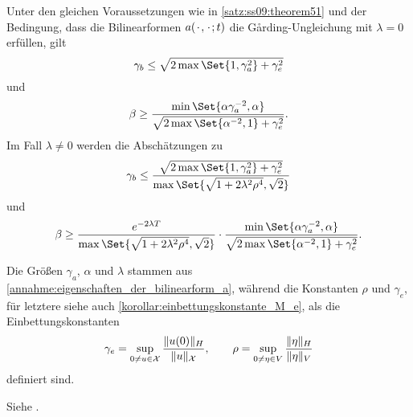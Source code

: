 \begin{Korollar}
\label{korrolar:ss09:theorem51_abschaetzungen}
    Unter den gleichen Voraussetzungen wie in \cref{satz:ss09:theorem51} und der Bedingung, dass die Bilinearformen $a({\mkern2mu\cdot\mkern2mu}, {\mkern2mu\cdot\mkern2mu}; t)$ die G\aa{}rding-Ungleichung mit $\lambda = 0$ erfüllen, gilt
    \begin{equation}
        \label{eq:ss09:theorem51_abschaetzungen:lambda_null:stetig}
        \gamma_{b}  \leq \sqrt{2 \max\Set{1, \gamma_{a}^{2}} + \gamma_{e}^{2}}
    \end{equation}
    und
    \begin{equation}
        \label{eq:ss09:theorem51_abschaetzungen:lambda_null:inf_sup}
        \beta  \geq \frac{\min\Set{\alpha \gamma_{a}^{-2}, \alpha}}{\sqrt{2 \max \Set{\alpha^{-2}, 1} + \gamma_{e}^{2}}}.
    \end{equation}
    Im Fall $\lambda \neq 0$ werden die Abschätzungen zu
    \begin{equation}
        \label{eq:ss09:theorem51_abschaetzungen:lambda_nicht_null:stetig}
        \gamma_{b}  \leq \frac{\sqrt{2\max\Set{1, \gamma_{a}^{2}} + \gamma_{e}^{2}}}{\max\Set{\sqrt{1 + 2 \lambda^{2} \rho^{4}}, \sqrt{2}}}
    \end{equation}
    und
    \begin{equation}
        \label{eq:ss09:theorem51_abschaetzungen:lambda_nicht_null:inf_sup}
        \beta  \geq \frac{ e^{-2 \lambda T}}{\max\Set{\sqrt{1 + 2 \lambda^{2} \rho^{4}}, \sqrt{2}}  } \cdot \frac{\min\Set{\alpha \gamma_{a}^{-2}, \alpha}}{\sqrt{2 \max\Set{ \alpha^{-2}, 1} + \gamma_{e}^{2}}}.
    \end{equation}

    Die Größen $\gamma_{a}$, $\alpha$ und $\lambda$ stammen aus \cref{annahme:eigenschaften_der_bilinearform_a},
    während die Konstanten $\rho$ und $\gamma_{e}$, für letztere siehe auch \cref{korollar:einbettungskonstante_M_e}, als die Einbettungskonstanten
    \begin{equation}
        \label{eq:ss09:einbettungskonstanten}
        \gamma_{e} = \sup_{0 \neq u \in \mathcal X} \frac{\lVert u(0)\rVert_{H}}{\lVert u\rVert_{\mathcal X}}, \qquad
        \rho = \sup_{0 \neq \eta \in V} \frac{\lVert\eta\rVert_{H}}{\lVert\eta\rVert_{V}}
    \end{equation}
    definiert sind.

    \begin{Beweis}
        Siehe \cite[Appendix A]{Schwab:2009ec}.
    \end{Beweis}
\end{Korollar}
